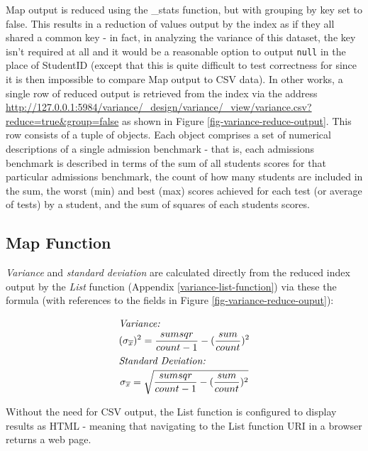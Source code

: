 Map output is reduced using the \_stats function, but with grouping by key set to false. This results in a reduction of values output by the index as if they all shared a common key - in fact, in analyzing the variance of this dataset, the key isn't required at all and it would be a reasonable option to output \texttt{null} in the place of StudentID (except that this is quite difficult to test correctness for since it is then impossible to compare Map output to CSV data). In other works, a single row of reduced output is retrieved from the index via the address \url{http://127.0.0.1:5984/variance/_design/variance/_view/variance.csv?reduce=true&group=false} as shown in Figure \ref{fig-variance-reduce-output}. This row consists of a tuple of objects. Each object comprises a set of numerical descriptions of a single admission benchmark - that is, each admissions benchmark is described in terms of the sum of all students scores for that particular admissions benchmark, the count of how many students are included in the sum, the worst (min) and best (max) scores achieved for each test (or average of tests) by a student, and the sum of squares of each students scores.



\subsection{Map Function}
\textit{Variance} and \textit{standard deviation} are calculated directly from the reduced index output by the \textit{List} function (Appendix \ref{variance-list-function}) via these the formula (with references to the fields in Figure \ref{fig-variance-reduce-ouput}):

\begin{spreadlines}{15pt}
    \begin{gather*}
        \intertext{\textit{Variance:}}
        (\sigma_{\overline{x}})^{2} = \frac{sumsqr}{count-1} - (\frac{sum}{count})^{2}\\
        \intertext{\textit{Standard Deviation:}}
        \sigma_{\overline{x}} = \sqrt{\frac{sumsqr}{count-1} - (\frac{sum}{count})^{2}}
    \end{gather*}
\end{spreadlines}

Without the need for CSV output, the List function is configured to display results as HTML - meaning that navigating to the List function URI in a browser returns a web page.